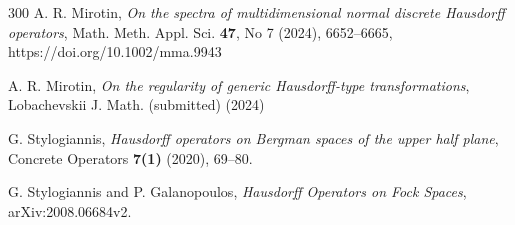 \documentclass[12pt,reqno]{amsart}
\begin{document}
\begin{thebibliography}{300}
A. R. Mirotin, {\it On the spectra of multidimensional normal discrete Hausdorff operators},  Math. Meth. Appl. Sci. {\bf 47}, No 7  (2024), 6652--6665,  https://doi.org/10.1002/mma.9943
  
A. R. Mirotin, {\it On the regularity  of generic Hausdorff-type transformations}, Lobachevskii J. Math. (submitted) (2024)

 G. Stylogiannis, {\it Hausdorff operators on Bergman spaces of the upper half plane}, Concrete Operators {\bf 7(1)} (2020), 69--80.

 G. Stylogiannis and P. Galanopoulos, {\it Hausdorff Operators on Fock Spaces},  arXiv:2008.06684v2.






\end{thebibliography}
\end{document}
